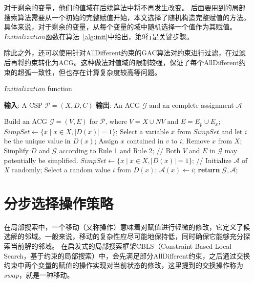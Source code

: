 对于剩余的变量，他们的值域在后续算法中将不再发生改变。
后面要用到的局部搜索算法需要从一个初始的完整赋值开始，本文选择了随机构造完整赋值的方法。具体来说，对于剩余的变量，从每个变量的域中随机选择一个值作为其赋值。
$Initialization$函数在算法~\ref{alg:init}中给出，第9行是关键步骤。

除此之外，还可以使用针对AllDifferent约束的GAC算法对约束进行过滤，在过滤后再将约束转化为ACG。这种做法对值域的限制较强，保证了每个AllDifferent约束的超弧一致性，但也存在计算复杂度较高等问题。


\begin{algorithm}[t]
    \caption{$Initialization$ function}
    \label{alg:init}
    \textbf{输入}: A CSP $\mathcal{P} = (X, D, C)$ \newline
    \textbf{输出}: An ACG $\mathcal{G}$ and an complete assignment $\mathcal{A}$
    \begin{algorithmic}[1] %
        \Statex \hrulefill
        \STATE Build an ACG $\mathcal{G} = (V, E)$ for $\mathcal{P}$, where $V = X\cup NV$ and $E = E_p\cup E_x$;
        \STATE $SimpSet \leftarrow \{ x \mid x \in X, |D(x)| = 1 \}$;
        \REPEAT
            \STATE Select a variable $x$ from $SimpSet$ and let $i$ be the unique value in $D(x)$;
                \STATE Assign $x$ contained in $v$ to $i$;
            \ENDFOR
            \STATE Remove $x$ from $X$;
            \STATE Simplify $D$ and $\mathcal{G}$ according to Rule 1 and Rule 2;
            \STATE // Both $V$ and $E$ in $\mathcal{G}$ may potentially be simplified.
            \STATE $SimpSet \leftarrow \{ x \mid x \in X, |D(x)| = 1 \}$;
        \STATE // Initialize $\mathcal{A}$ of $X$ randomly;
            \STATE Select a random value $i$ from $D(x)$;
            \STATE $\mathcal{A}(x) \leftarrow i$;
        \ENDFOR
        \STATE \textbf{return} $\mathcal{G}, \mathcal{A}$;
    \end{algorithmic}
\end{algorithm}

\section{分步选择操作策略}
在局部搜索中，一个移动（又称操作）意味着对赋值进行轻微的修改，它定义了候选解的邻域。一般来说，移动的复杂性应尽可能地保持低，同时确保它能够充分探索当前解的邻域。
在启发式的局部搜索框架CBLS（Constraint-Based Local Search，基于约束的局部搜索）中，会先满足部分AllDifferent约束，之后通过交换约束中两个变量的赋值的操作实现对当前状态的修改，这里提到的交换操作称为$swap$，就是一种移动。

